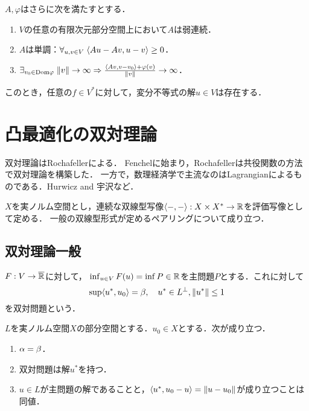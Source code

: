 \documentclass[uplatex,dvipdfmx]{jsreport}
\begin{document}
\begin{theorem}
    $A,\varphi$はさらに次を満たすとする．
    \begin{enumerate}
        \item $V$の任意の有限次元部分空間上において$A$は弱連続．
        \item $A$は単調：$\forall_{u,v\in V}\;\langle Au-Av,u-v\rangle\ge0$．
        \item $\exists_{v_0\in\mathrm{Dom}\varphi}\;\|v\|\to\infty\Rightarrow\frac{\langle Av,v-v_0\rangle+\varphi(v)}{\|v\|}\to\infty$．
    \end{enumerate}
    このとき，任意の$f\in V^*$に対して，変分不等式の解$u\in V$は存在する．
\end{theorem}

\section{凸最適化の双対理論}

\begin{tcolorbox}[colframe=ForestGreen, colback=ForestGreen!10!white,breakable,colbacktitle=ForestGreen!40!white,coltitle=black,fonttitle=\bfseries\sffamily,
title=]
    双対理論はRochafellerによる．
    Fenchelに始まり，Rochafellerは共役関数の方法で双対理論を構築した．
    一方で，数理経済学で主流なのはLagrangianによるものである．Hurwicz and 宇沢など．
\end{tcolorbox}

\begin{notation}
    $X$を実ノルム空間とし，連続な双線型写像$\langle-,-\rangle:X\times X^*\to\mathbb{R}$を評価写像として定める．
    一般の双線型形式が定めるペアリングについて成り立つ．
\end{notation}

\subsection{双対理論一般}

\begin{definition}
    $F:V\to\overline{\mathbb{R}}$に対して，
    $\inf_{u\in V}F(u)=\inf P\in\mathbb{R}$を主問題$P$とする．これに対して
    \[\sup\langle u^*,u_0\rangle=\beta,\quad u^*\in L^\perp,\|u^*\|\le1\]
    を双対問題という．
\end{definition}

\begin{theorem}
    $L$を実ノルム空間$X$の部分空間とする．$u_0\in X$とする．次が成り立つ．
    \begin{enumerate}
        \item $\alpha=\beta$．
        \item 双対問題は解$u^*$を持つ．
        \item $u\in L$が主問題の解であることと，$\langle u^*,u_0-u\rangle=\|u-u_0\|$が成り立つことは同値．
    \end{enumerate}
\end{theorem}
\end{document}
